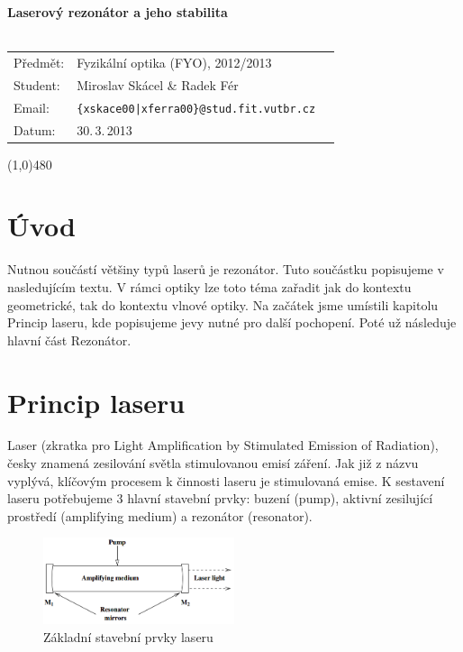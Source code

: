 \documentclass[a4paper,12pt]{article}
\begin{document}
\renewcommand{\refname}{Literatura}
\thispagestyle{empty}
{\LARGE \bf Laserový rezonátor a jeho stabilita}\\
\\
{\large
\begin{tabularx}{\textwidth}{l l X}
    Předmět: & Fyzikální optika (FYO), 2012/2013 & \\
    Student: & Miroslav Skácel \& Radek Fér & \\
    Email: & \texttt{\{xskace00|xferra00\}@stud.fit.vutbr.cz} & \\
Datum: & 30.\,3.\,2013 & \\
\end{tabularx}}
\begin{center}
\line(1,0){480}
\end{center}
\section{Úvod}
Nutnou součástí většiny typů laserů je rezonátor. Tuto součástku popisujeme v nasledujícím textu. V rámci optiky lze toto téma zařadit jak do kontextu geometrické, tak do kontextu vlnové optiky.
Na začátek jsme umístili kapitolu Princip laseru, kde popisujeme jevy nutné pro další pochopení. Poté už následuje hlavní část Rezonátor.

\section{Princip laseru}
Laser (zkratka pro Light Amplification by Stimulated Emission of Radiation), česky znamená zesilování světla stimulovanou emisí záření. Jak již z názvu vyplývá, klíčovým procesem k činnosti laseru je stimulovaná emise. K sestavení laseru potřebujeme 3 hlavní stavební prvky: buzení (pump), aktivní zesilující prostředí (amplifying medium) a rezonátor (resonator).

\begin{figure}[h!]
  \centering
    \includegraphics[width=0.5\textwidth]{images/image02.png}
    \caption{Základní stavební prvky laseru \cite{optics}}
\end{figure}
\end{document}
